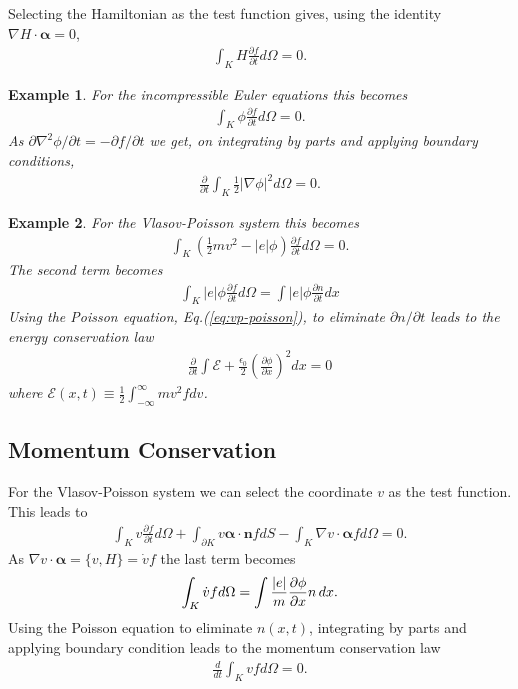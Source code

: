 \documentclass[11pt, reqno]{amsart}
\newcommand{\eqr}[1]{Eq.\thinspace(#1)}
\newcommand{\pfrac}[2]{\frac{\partial #1}{\partial #2}}
\newcommand{\pfraca}[1]{\frac{\partial}{\partial #1}}
\newcommand{\mvec}[1]{\mathbf{#1}}
\newcommand{\gvec}[1]{\boldsymbol{#1}}
\newtheorem{example}{Example}
\theoremstyle{definition}
\begin{document}
Selecting the Hamiltonian as the test function gives, using the
identity $\nabla H \cdot \gvec{\alpha} = 0$,
\begin{align}
  \int_K H \pfrac{f}{t}d\Omega = 0.
\end{align}

\begin{example}
  For the incompressible Euler equations this becomes
  \begin{align}
    \int_K \phi \pfrac{f}{t}d\Omega = 0.
  \end{align}
  As ${\partial \nabla^2 \phi}/{\partial t} = -\partial f/{\partial
    t}$ we get, on integrating by parts and applying boundary
  conditions,
  \begin{align}
    \pfraca{t}\int_K \frac{1}{2} |\nabla\phi|^2  d\Omega = 0.
  \end{align}
\end{example}

\begin{example}
  For the Vlasov-Poisson system this becomes
  \begin{align}
    \int_K \left(\frac{1}{2}mv^2 - |e|\phi\right) \pfrac{f}{t}d\Omega = 0.
  \end{align}
  The second term becomes
  \begin{align}
    \int_K |e|\phi \pfrac{f}{t}d\Omega = \int |e|\phi \pfrac{n}{t} dx
  \end{align}
  Using the Poisson equation, \eqr{\ref{eq:vp-poisson}}, to eliminate
  ${\partial n}/{\partial t}$ leads to the energy conservation law
  \begin{align}
    \pfraca{t}\int \mathcal{E} +
    \frac{\epsilon_0}{2}\left(\pfrac{\phi}{x}\right)^2 dx = 0
  \end{align}
  where $\mathcal{E}(x,t) \equiv \frac{1}{2}\int_{-\infty}^{\infty} mv^2f dv$.
\end{example}

\subsection{Momentum Conservation}

For the Vlasov-Poisson system we can select the coordinate $v$ as the
test function. This leads to
\begin{align}
  \int_K v\pfrac{f}{t}d\Omega 
  + \int_{\partial K}v \gvec{\alpha}\cdot\mvec{n}f dS
  - \int_K \nabla v \cdot \gvec{\alpha} f d\Omega
 = 0.
\end{align}
As $\nabla v \cdot \gvec{\alpha} = \{v,H\} = \dot{v}f$ the last term
becomes
\begin{align}
  \int_K\dot{v} f d\Omega = \int \frac{|e|}{m} \pfrac{\phi}{x} n\thinspace dx.
\end{align}
Using the Poisson equation to eliminate $n(x,t)$, integrating by parts
and applying boundary condition leads to the momentum conservation law
\begin{align}
  \frac{d}{dt}\int_K vf d\Omega = 0.
\end{align}
\end{document}
